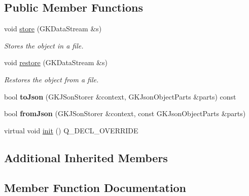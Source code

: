 \subsection*{Public Member Functions}
\begin{DoxyCompactItemize}
\item 
void \hyperlink{classNetworkGUIAP_a3d4b8144188d8ac9bf2229f5cc47cb39}{store} (G\+K\+Data\+Stream \&s)\hypertarget{classNetworkGUIAP_a3d4b8144188d8ac9bf2229f5cc47cb39}{}\label{classNetworkGUIAP_a3d4b8144188d8ac9bf2229f5cc47cb39}

\begin{DoxyCompactList}\small\item\em Stores the object in a file. \end{DoxyCompactList}\item 
void \hyperlink{classNetworkGUIAP_a3f3abcb32f88dee3af58098a75007fab}{restore} (G\+K\+Data\+Stream \&s)\hypertarget{classNetworkGUIAP_a3f3abcb32f88dee3af58098a75007fab}{}\label{classNetworkGUIAP_a3f3abcb32f88dee3af58098a75007fab}

\begin{DoxyCompactList}\small\item\em Restores the object from a file. \end{DoxyCompactList}\item 
bool {\bfseries to\+Json} (G\+K\+J\+Son\+Storer \&context, G\+K\+Json\+Object\+Parts \&parts) const \hypertarget{classNetworkGUIAP_a3aba62a265fee3dd50b5168febbca273}{}\label{classNetworkGUIAP_a3aba62a265fee3dd50b5168febbca273}

\item 
bool {\bfseries from\+Json} (G\+K\+J\+Son\+Storer \&context, const G\+K\+Json\+Object\+Parts \&parts)\hypertarget{classNetworkGUIAP_a75f56399dca21be1a48c8cd1370fb671}{}\label{classNetworkGUIAP_a75f56399dca21be1a48c8cd1370fb671}

\item 
virtual void \hyperlink{classNetworkGUIAP_aeb618492efbfb05d298dcea35078a92b}{init} () Q\+\_\+\+D\+E\+C\+L\+\_\+\+O\+V\+E\+R\+R\+I\+DE
\end{DoxyCompactItemize}
\subsection*{Additional Inherited Members}


\subsection{Member Function Documentation}
